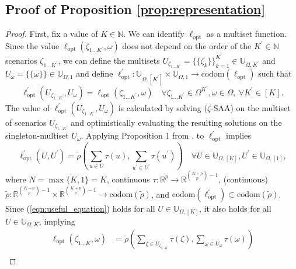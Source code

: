 \subsection*{Proof of Proposition \ref{prop:representation}}
\begin{proof}
First, fix a value of $K \in \mathbb{N}$. We can identify $\ell_{\text{opt}}$ as a multiset function. Since the value $\ell_{\text{opt}}(\zeta_{1...K^{\prime}}, \omega)$ does not depend on the order of the $K^{\prime} \in \mathbb{N}$ scenarios $\zeta_{1...K^{\prime}}$, we can define the multisets $U_{\zeta_{1...K^{\prime}}} = \{\{ \zeta_k \}\}_{k = 1}^{K^{\prime}} \in \mathbb{U}_{\Omega, K^{\prime}}$ and $U_{\omega} = \{\{ \omega \}\} \in \mathbb{U}_{\Omega, 1}$ and define $\ell_{\text{opt}}^{\prime} : \mathbb{U}_{\Omega, [K^{\prime}]} \times \mathbb{U}_{\Omega, 1} \rightarrow \text{codom}(\ell_{\text{opt}})$ such that
$$
\ell_{\text{opt}}^{\prime} \left( U_{\zeta_{1...K^{\prime}}}, U_{\omega} \right) = \ell_{\text{opt}}(\zeta_{1...K^{\prime}}, \omega) \quad \forall \zeta_{1...K^{\prime}} \in \Omega^{K^{\prime}}, \omega \in \Omega, \ \forall K^{\prime} \in [K]. 
$$
The value of $\ell_{\text{opt}}^{\prime} \left( U_{\zeta_{1...K^{\prime}}}, U_{\omega} \right)$ is calculated by solving ($\zeta$-SAA) on the multiset of scenarios $U_{\zeta_{1...K^{\prime}}}$ and optimistically evaluating the resulting solutions on the singleton-multiset $U_{\omega}$. Applying Proposition 1 from \citep{tabaghi2024universal}, to $\ell_{\text{opt}}^{\prime}$ implies 
\begin{equation} \label{eqn:useful_equation}
    \ell_{\text{opt}}^{\prime} \left( U, U^{\prime} \right) = \tilde{\rho} \left( \sum_{u \in U} \tau(u), \sum_{u^{\prime} \in U^{\prime}} \tau(u^{\prime}) \right) \quad \forall U \in \mathbb{U}_{\Omega,[K]}, U^{\prime} \in \mathbb{U}_{\Omega,[1]}, 
\end{equation}
where $N = \max \{K, 1 \} = K$, continuous $\tau: \mathbb{R}^{p} \rightarrow \mathbb{R}^{{K+p \choose p}-1}$, (continuous) $\tilde{\rho}: \mathbb{R}^{{K+p \choose p}-1} \times \mathbb{R}^{{K+p \choose p}-1} \rightarrow \text{codom}(\tilde{\rho})$, and $\text{codom}(\ell_{\text{opt}}^{\prime}) \subset \text{codom}(\tilde{\rho})$.
Since (\ref{eqn:useful_equation}) holds for all $U \in \mathbb{U}_{\Omega,[K]}$,  it also holds for all $U \in \mathbb{U}_{\Omega,K}$, implying 
\begin{align*}
\ell_{\text{opt}}(\zeta_{1...K}, \omega)  &= \tilde{\rho} \left( \sum_{\zeta \in U_{\zeta_{1...K}}} \tau(\zeta), \sum_{\omega \in U_{\omega}} \tau(\omega) \right) \\

\end{align*}
\end{proof}
